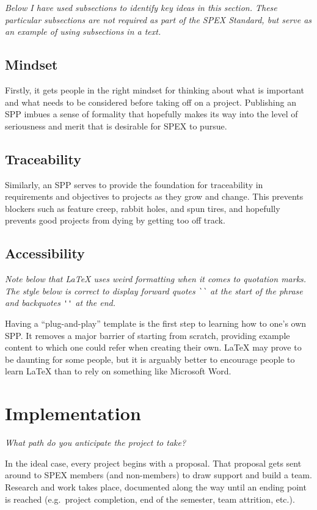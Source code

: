 \documentclass[journal]{SPEXformat}
\newcommand*{\HELP}{}%
\begin{document}
\ifdefined\HELP\em
  Below I have used subsections to identify key ideas in this section. These particular subsections are not required as part of the SPEX Standard, but serve as an example of using subsections in a text.
\em\fi

\subsection{Mindset}
\label{subsec:mindset}
Firstly, it gets people in the right mindset for thinking about what is important and what needs to be considered before taking off on a project.
Publishing an SPP imbues a sense of formality that hopefully makes its way into the level of seriousness and merit that is desirable for SPEX to pursue.

\subsection{Traceability}
\label{subsec:traceability}
Similarly, an SPP serves to provide the foundation for traceability in requirements and objectives to projects as they grow and change.
This prevents blockers such as feature creep, rabbit holes, and spun tires, and hopefully prevents good projects from dying by getting too off track.

\subsection{Accessibility}
\label{subsec:plug-n-play}
\ifdefined\HELP\em
  Note below that LaTeX uses weird formatting when it comes to quotation marks.
  The style below is correct to display forward quotes \verb|``| at the start of the phrase and backquotes \verb|''| at the end.
\em\fi

Having a ``plug-and-play'' template is the first step to learning how to one's own SPP\@.
It removes a major barrier of starting from scratch, providing example content to which one could refer when creating their own.
\LaTeX{} may prove to be daunting for some people, but it is arguably better to encourage people to learn LaTeX than to rely on something like Microsoft Word.

\section{Implementation}
\label{sec:implementation}
\ifdefined\HELP\em
  What path do you anticipate the project to take?
\em\fi

In the ideal case, every project begins with a proposal.
That proposal gets sent around to SPEX members (and non-members) to draw support and build a team.
Research and work takes place, documented along the way until  an ending point is reached (e.g.\ project completion, end of the semester, team attrition, etc.).
\end{document}
